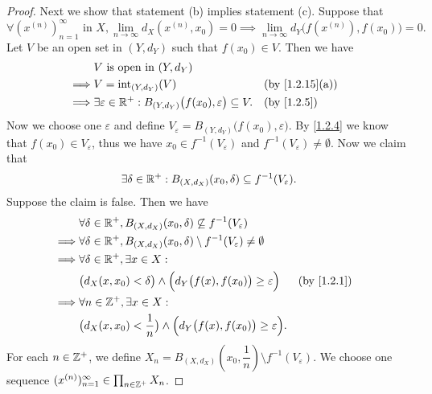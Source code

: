 \begin{proof}
  Next we show that statement (b) implies statement (c).
  Suppose that
  \[
    \forall (x^{(n)})_{n = 1}^\infty \text{ in } X, \lim_{n \to \infty} d_X(x^{(n)}, x_0) = 0 \implies \lim_{n \to \infty} d_Y\big(f(x^{(n)}), f(x_0)\big) = 0.
  \]
  Let \(V\) be an open set in \((Y, d_Y)\) such that \(f(x_0) \in V\).
  Then we have
  \begin{align*}
             & V \text{ is open in } (Y, d_Y)                                                                                          \\
    \implies & V = \text{int}_{(Y, d_Y)}(V)                                                          &  & \text{(by \cref{1.2.15}(a))} \\
    \implies & \exists \varepsilon \in \R^+ : B_{(Y, d_Y)}\big(f(x_0), \varepsilon\big) \subseteq V. &  & \by{1.2.5}
  \end{align*}
  Now we choose one \(\varepsilon\) and define \(V_\varepsilon = B_{(Y, d_Y)}\big(f(x_0), \varepsilon\big)\).
  By \cref{1.2.4} we know that \(f(x_0) \in V_\varepsilon\), thus we have \(x_0 \in f^{-1}(V_\varepsilon)\) and \(f^{-1}(V_\varepsilon) \neq \emptyset\).
  Now we claim that
  \[
    \exists \delta \in \mathbb{R}^+ : B_{(X, d_X)}(x_0, \delta) \subseteq f^{-1}(V_\varepsilon).
  \]
  Suppose the claim is false.
  Then we have
  \begin{align*}
             & \forall \delta \in \R^+, B_{(X, d_X)}(x_0, \delta) \not\subseteq f^{-1}(V_\varepsilon)                            \\
    \implies & \forall \delta \in \R^+, B_{(X, d_X)}(x_0, \delta) \setminus f^{-1}(V_\varepsilon) \neq \emptyset                 \\
    \implies & \forall \delta \in \R^+, \exists x \in X :                                                                        \\
             & \big(d_X(x, x_0) < \delta\big) \land \Big(d_Y\big(f(x), f(x_0)\big) \geq \varepsilon\Big)         &  & \by{1.2.1} \\
    \implies & \forall n \in \Z^+, \exists x \in X :                                                                             \\
             & \big(d_X(x, x_0) < \dfrac{1}{n}\big) \land \Big(d_Y\big(f(x), f(x_0)\big) \geq \varepsilon\Big).
  \end{align*}
  For each \(n \in \mathbb{Z}^+\), we define \(X_n = B_{(X, d_X)}(x_0, \dfrac{1}{n}) \setminus f^{-1}(V_\varepsilon)\).
  We choose one sequence \((x^{(n)})_{n = 1}^\infty \in \prod_{n \in \mathbb{Z}^+} X_n\).

\end{proof}
